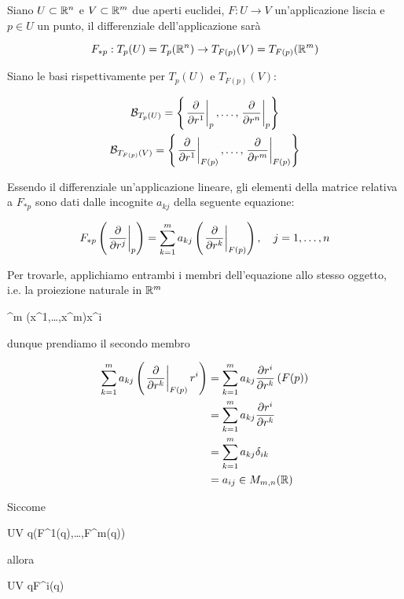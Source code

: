 Siano $ U \subset \mathbb{R}^{n} $ e $ V \subset \mathbb{R}^{m} $ due aperti euclidei, $ F : U \to V $ un'applicazione liscia e $ p \in U $ un punto, il differenziale dell'applicazione sarà

\begin{equation}
	F_{*p} : T_{p}(U) = T_{p}(\mathbb{R}^{n}) \to T_{F(p)}(V) = T_{F(p)}(\mathbb{R}^{m})
\end{equation}

Siano le basi rispettivamente per $ T_{p}(U) $ e $ T_{F(p)}(V) $:

\begin{gather}
	\B_{T_{p}(U)} = \left\{ \eval{ \pdv{r^{1}} }_{p}, \dots, \eval{ \pdv{r^{n}} }_{p} \right\}\\
	\B_{T_{F(p)}(V)} = \left\{ \eval{ \pdv{r^{1}} }_{F(p)}, \dots, \eval{ \pdv{r^{m}} }_{F(p)} \right\}
\end{gather}

Essendo il differenziale un'applicazione lineare, gli elementi della matrice relativa a $ F_{*p} $ sono dati dalle incognite $ a_{kj} $ della seguente equazione:

\begin{equation}
	F_{*p} \left( \eval{ \pdv{r^{j}} }_{p} \right) = \sum_{k=1}^{m} a_{kj} \left( \eval{ \pdv{r^{k}} }_{F(p)} \right) \qcomma j=1,\dots,n
\end{equation}

Per trovarle, applichiamo entrambi i membri dell'equazione allo stesso oggetto, i.e. la proiezione naturale in $ \mathbb{R}^{m} $

	{\R^{m}}{\R}
	{(x^{1},\dots,x^{m})}{x^{i}}

dunque prendiamo il secondo membro

\begin{align}
	\begin{split}
		\sum_{k=1}^{m} a_{kj} \left( \eval{ \pdv{r^{k}} }_{F(p)} r^{i} \right) &= \sum_{k=1}^{m} a_{kj} \pdv{r^{i}}{r^{k}} \, (F(p))\\
		&= \sum_{k=1}^{m} a_{kj} \pdv{r^{i}}{r^{k}}\\
		&= \sum_{k=1}^{m} a_{kj} \delta_{ik}\\
		&= a_{ij} \in M_{m,n}(\R)
	\end{split}
\end{align}

Siccome

	{U}{V}
	{q}{(F^{1}(q),\dots,F^{m}(q))}

allora

	{U}{V}
	{q}{F^{i}(q)}

